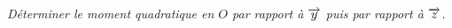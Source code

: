 \documentclass[10pt,fleqn]{article} %
\begin{document}
\begin{multicols}{2}
\begin{center}
\end{center}

\subparagraph{}\textit{Déterminer le moment quadratique en $O$ par rapport à $\overrightarrow{y}$ puis par rapport à $\overrightarrow{z}$. }


\end{multicols}
\end{document}
